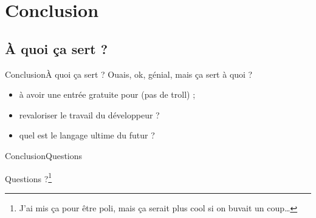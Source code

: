 \documentclass[notes]{beamer}
\newcommand{\ofgfr}[1]{\og{}#1\fg{}}
\begin{document}
\section{Conclusion}

\subsection{À quoi ça sert ?}

\begin{frame}{Conclusion}{À quoi ça sert ?}
\pause
\ofgfr{Ouais, ok, génial, mais ça sert à quoi ?}
\pause
\begin{itemize}[<+->]
\item à avoir une entrée gratuite pour \sw (pas de troll) ;
\item revaloriser le travail du développeur ?
\item quel est le langage ultime du futur ?
\end{itemize}
\end{frame}

\begin{frame}{Conclusion}{Questions}
\pause
\begin{center}
{\LARGE Questions ?\footnote{J'ai mis ça pour être poli, mais ça serait plus cool
si on buvait un coup…}}
\end{center}
\end{frame}
\end{document}
